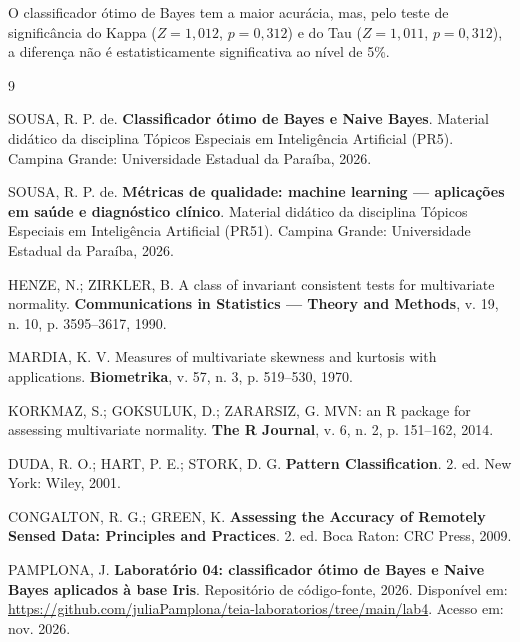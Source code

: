 \documentclass[12pt,a4paper]{article}
\newcommand{\repositorio}{\url{https://github.com/juliaPamplona/teia-laboratorios/tree/main/lab4}}
\begin{document}
O classificador ótimo de Bayes tem a maior acurácia, mas, pelo teste de significância do Kappa ($Z = 1{,}012$, $p = 0{,}312$) e do Tau ($Z = 1{,}011$, $p = 0{,}312$), a diferença não é estatisticamente significativa ao nível de 5\%.

\begin{thebibliography}{9}

SOUSA, R. P. de. \textbf{Classificador ótimo de Bayes e Naive Bayes}. Material didático da disciplina Tópicos Especiais em Inteligência Artificial (PR5). Campina Grande: Universidade Estadual da Paraíba, 2026.

SOUSA, R. P. de. \textbf{Métricas de qualidade: machine learning --- aplicações em saúde e diagnóstico clínico}. Material didático da disciplina Tópicos Especiais em Inteligência Artificial (PR51). Campina Grande: Universidade Estadual da Paraíba, 2026.

HENZE, N.; ZIRKLER, B. A class of invariant consistent tests for multivariate normality. \textbf{Communications in Statistics --- Theory and Methods}, v. 19, n. 10, p. 3595--3617, 1990.

MARDIA, K. V. Measures of multivariate skewness and kurtosis with applications. \textbf{Biometrika}, v. 57, n. 3, p. 519--530, 1970.

KORKMAZ, S.; GOKSULUK, D.; ZARARSIZ, G. MVN: an R package for assessing multivariate normality. \textbf{The R Journal}, v. 6, n. 2, p. 151--162, 2014.

DUDA, R. O.; HART, P. E.; STORK, D. G. \textbf{Pattern Classification}. 2. ed. New York: Wiley, 2001.

CONGALTON, R. G.; GREEN, K. \textbf{Assessing the Accuracy of Remotely Sensed Data: Principles and Practices}. 2. ed. Boca Raton: CRC Press, 2009.

PAMPLONA, J. \textbf{Laboratório 04: classificador ótimo de Bayes e Naive Bayes aplicados à base Iris}. Repositório de código-fonte, 2026. Disponível em: \repositorio. Acesso em: nov. 2026.

\end{thebibliography}
\end{document}
